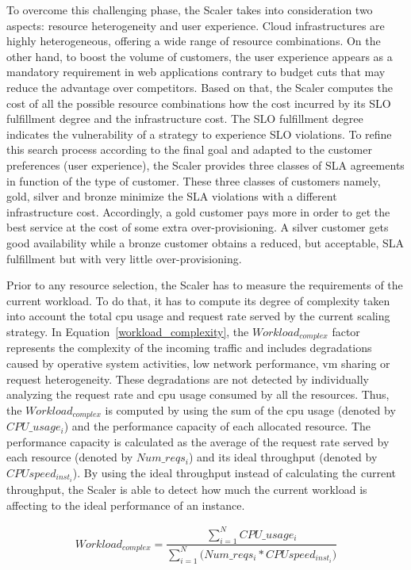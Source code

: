 To overcome this challenging phase, the Scaler takes into consideration two aspects: resource heterogeneity and user experience. Cloud infrastructures are highly heterogeneous, offering a wide range of resource combinations. On the other hand, to boost the volume of customers, the user experience appears as a mandatory requirement in web applications contrary to budget cuts that may reduce the advantage over competitors.
Based on that, the Scaler computes the cost of all the possible resource combinations how the cost incurred by its SLO fulfillment degree and the infrastructure cost. The SLO fulfillment degree indicates the vulnerability of a strategy to experience SLO violations. To refine this search process according to the final goal and adapted to the customer preferences (user experience), the Scaler provides three classes of SLA agreements in function of the type of customer. These three classes of customers namely, gold, silver and bronze minimize the SLA violations with a different infrastructure cost. Accordingly, a gold customer pays more in order to get the best service at the cost of some extra over-provisioning. A silver customer gets good availability while a bronze customer obtains a reduced, but acceptable, SLA fulfillment but with very little over-provisioning.

Prior to any resource selection, the Scaler has to measure the requirements of the current workload. To do that, it has to compute its degree of complexity taken into account the total cpu usage and request rate served by the current scaling strategy. In Equation~\ref{workload_complexity}, the \emph{$Workload_{complex}$} factor represents the complexity of the incoming traffic and includes degradations caused by operative system activities, low network performance, vm sharing or request heterogeneity. These degradations are not detected by individually analyzing the request rate and cpu usage consumed by all the resources. Thus, the \emph{$Workload_{complex}$} is computed by using the sum of the cpu usage (denoted by \emph{$CPU\_usage_{i}$}) and the performance capacity of each allocated resource. The performance capacity is calculated as the average of the request rate served by each resource (denoted by $Num\_reqs_{i}$) and its ideal throughput (denoted by $CPU speed_{inst_{i}}$). By using the ideal throughput instead of calculating the current throughput, the Scaler is able to detect how much the current workload is affecting to the ideal performance of an instance.

{\scriptsize
\begin{equation}\label{workload_complexity}
\begin{split}
Workload_{complex}  = \dfrac{ \sum_{i=1}^N CPU\_usage_{i}  }  {  \sum_{i=1}^N \bigg(  Num\_reqs_{i}  * CPU speed_{inst_{i}}   \bigg)   }
\end{split}
\end{equation}
}

